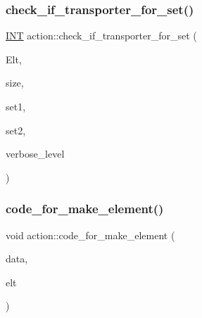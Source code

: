 \mbox{\label{classaction_a84f3aaa00cbc09fb93f131b16d1fd290}} 
\subsubsection{\texorpdfstring{check\+\_\+if\+\_\+transporter\+\_\+for\+\_\+set()}{check\_if\_transporter\_for\_set()}}
{\footnotesize\ttfamily \mbox{\hyperlink{galois_8h_a09fddde158a3a20bd2dcadb609de11dc}{I\+NT}} action\+::check\+\_\+if\+\_\+transporter\+\_\+for\+\_\+set (\begin{DoxyParamCaption}\item[{\mbox{\hyperlink{galois_8h_a09fddde158a3a20bd2dcadb609de11dc}{I\+NT}} $\ast$}]{Elt,  }\item[{\mbox{\hyperlink{galois_8h_a09fddde158a3a20bd2dcadb609de11dc}{I\+NT}}}]{size,  }\item[{\mbox{\hyperlink{galois_8h_a09fddde158a3a20bd2dcadb609de11dc}{I\+NT}} $\ast$}]{set1,  }\item[{\mbox{\hyperlink{galois_8h_a09fddde158a3a20bd2dcadb609de11dc}{I\+NT}} $\ast$}]{set2,  }\item[{\mbox{\hyperlink{galois_8h_a09fddde158a3a20bd2dcadb609de11dc}{I\+NT}}}]{verbose\+\_\+level }\end{DoxyParamCaption})}

\mbox{\label{classaction_a28b5219a8b654a30ac0560915aa26045}} 
\subsubsection{\texorpdfstring{code\+\_\+for\+\_\+make\+\_\+element()}{code\_for\_make\_element()}}
{\footnotesize\ttfamily void action\+::code\+\_\+for\+\_\+make\+\_\+element (\begin{DoxyParamCaption}\item[{\mbox{\hyperlink{galois_8h_a09fddde158a3a20bd2dcadb609de11dc}{I\+NT}} $\ast$}]{data,  }\item[{void $\ast$}]{elt }\end{DoxyParamCaption})}

